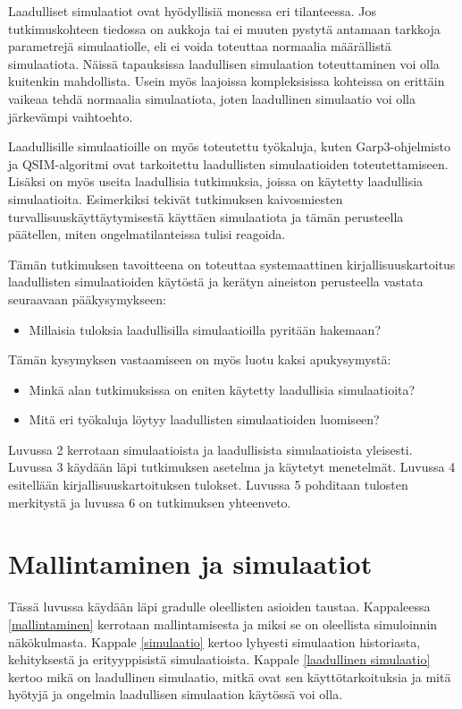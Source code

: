 \documentclass[utf8]{gradu3}
\begin{document}
Laadulliset simulaatiot ovat hyödyllisiä monessa eri tilanteessa. Jos tutkimuskohteen tiedossa on aukkoja tai ei muuten pystytä antamaan tarkkoja parametrejä simulaatiolle, eli ei voida toteuttaa normaalia määrällistä simulaatiota. Näissä tapauksissa laadullisen simulaation toteuttaminen voi olla kuitenkin mahdollista. Usein myös laajoissa kompleksisissa kohteissa on erittäin vaikeaa tehdä normaalia simulaatiota, joten laadullinen simulaatio voi olla järkevämpi vaihtoehto.

Laadullisille simulaatioille on myös toteutettu työkaluja, kuten Garp3-ohjelmisto \parencite{bredeweg2007garp3} ja QSIM-algoritmi \parencite{helgstrand2004qsim} ovat tarkoitettu laadullisten simulaatioiden toteutettamiseen. Lisäksi on myös useita laadullisia tutkimuksia, joissa on käytetty laadullisia simulaatioita. Esimerkiksi \textcite{cao2019depth} tekivät tutkimuksen kaivosmiesten turvallisuuskäyttäytymisestä käyttäen simulaatiota ja tämän perusteella päätellen, miten ongelmatilanteissa tulisi reagoida. 

Tämän tutkimuksen tavoitteena on toteuttaa systemaattinen kirjallisuuskartoitus laadullisten simulaatioiden käytöstä ja kerätyn aineiston perusteella vastata seuraavaan pääkysymykseen:
\begin{itemize}
    \item Millaisia tuloksia laadullisilla simulaatioilla pyritään hakemaan?
\end{itemize}

Tämän kysymyksen vastaamiseen on myös luotu kaksi apukysymystä:
\begin{itemize}
    \item Minkä alan tutkimuksissa on eniten käytetty laadullisia simulaatioita?
    \item Mitä eri työkaluja löytyy laadullisten simulaatioiden luomiseen?
\end{itemize}

Luvussa 2 kerrotaan simulaatioista ja laadullisista simulaatioista yleisesti. Luvussa 3 käydään läpi tutkimuksen asetelma ja käytetyt menetelmät. Luvussa 4 esitellään kirjallisuuskartoituksen tulokset. Luvussa 5 pohditaan tulosten merkitystä ja luvussa 6 on tutkimuksen yhteenveto.

\chapter{Mallintaminen ja simulaatiot}
Tässä luvussa käydään läpi gradulle oleellisten asioiden taustaa. 
Kappaleessa \ref{mallintaminen} kerrotaan mallintamisesta 
ja miksi se on oleellista simuloinnin näkökulmasta. 
Kappale \ref{simulaatio} kertoo lyhyesti simulaation historiasta, kehityksestä ja erityyppisistä simulaatioista. 
Kappale \ref{laadullinen simulaatio} kertoo mikä on laadullinen simulaatio, mitkä ovat sen käyttötarkoituksia ja mitä hyötyjä ja ongelmia laadullisen
simulaation käytössä voi olla.
\end{document}
